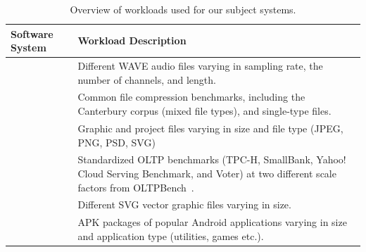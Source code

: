 \begin{table}
	\footnotesize
	\centering
	\caption{Overview of workloads used for our subject systems.}
	\begin{tabular}{lp{6cm}}
		\toprule
		\textbf{Software System} & \textbf{Workload Description} \\
		\midrule
		
		\jumper & Different WAVE audio files varying in sampling rate, the number of channels, and length. \\
		
		\midrule
		\kanzi  & Common file compression benchmarks, including the Canterbury corpus (mixed file types), and single-type files. \\
		
		\midrule
		\dconvert  & Graphic and project files varying in size and file type (JPEG, PNG, PSD, SVG) \\
		
		\midrule
		\htwo & Standardized OLTP benchmarks (TPC-H, SmallBank, Yahoo! Cloud Serving Benchmark, and Voter) at two different scale factors from \textsf{OLTPBench}~\cite{difallah_oltp_2013}. \\
		
		\midrule
		\batik  & Different SVG vector graphic files varying in size. \\
		
		\midrule
		\jadx  & APK packages of popular Android applications varying in size and application type (utilities, games etc.). \\
		\bottomrule
	\end{tabular}
\label{tab:workloads}
\end{table}

